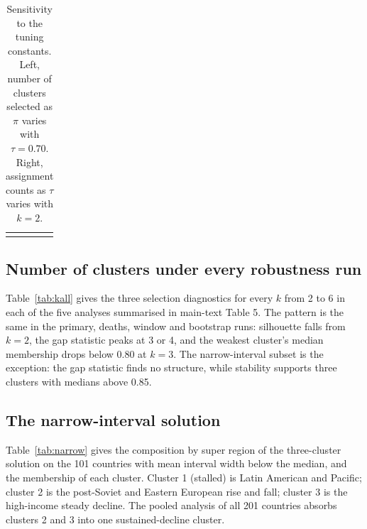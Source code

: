 \documentclass[11pt,a4paper]{article}
\begin{document}
\begin{table}[h]
\centering\small
\caption{Sensitivity to the tuning constants. Left, number of clusters selected as $\pi$ varies with $\tau = 0.70$. Right, assignment counts as $\tau$ varies with $k = 2$.}
\label{tab:thresholds}
\begin{tabular}{cc}
 &  \\
\end{tabular}
\end{table}

\subsection{Number of clusters under every robustness run}

Table~\ref{tab:kall} gives the three selection diagnostics for every $k$ from 2 to 6 in each of the five analyses summarised in main-text Table 5. The pattern is the same in the primary, deaths, window and bootstrap runs: silhouette falls from $k = 2$, the gap statistic peaks at 3 or 4, and the weakest cluster's median membership drops below 0.80 at $k = 3$. The narrow-interval subset is the exception: the gap statistic finds no structure, while stability supports three clusters with medians above 0.85.

\begin{table}[h]
\centering\footnotesize
\caption{Selection diagnostics for every analysis. Gap statistic with standard error from 100 reference sets; membership probabilities from 1,000 draws.}
\label{tab:kall}
\end{table}

\subsection{The narrow-interval solution}

Table~\ref{tab:narrow} gives the composition by super region of the three-cluster solution on the 101 countries with mean interval width below the median, and the membership of each cluster. Cluster 1 (stalled) is Latin American and Pacific; cluster 2 is the post-Soviet and Eastern European rise and fall; cluster 3 is the high-income steady decline. The pooled analysis of all 201 countries absorbs clusters 2 and 3 into one sustained-decline cluster.

\begin{table}[h]
\centering\small
\caption{Composition of the three-cluster solution on the narrowest half of intervals.}
\label{tab:narrow}
\end{table}
\end{document}
